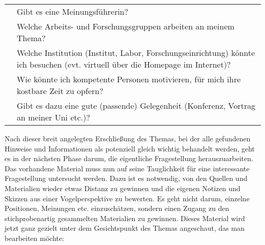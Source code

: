 \documentclass[]{article}
\begin{document}
\begin{longtable}[]{@{}rl@{}}
\begin{minipage}[t]{0.27\columnwidth}\raggedleft\strut
\strut
\end{minipage} & \begin{minipage}[t]{0.67\columnwidth}\raggedright\strut
Gibt es eine Meinungsführerin?\strut
\end{minipage}\tabularnewline
\begin{minipage}[t]{0.27\columnwidth}\raggedleft\strut
\strut
\end{minipage} & \begin{minipage}[t]{0.67\columnwidth}\raggedright\strut
Welche Arbeits- und Forschungsgruppen arbeiten an meinem Thema?\strut
\end{minipage}\tabularnewline
\begin{minipage}[t]{0.27\columnwidth}\raggedleft\strut
\strut
\end{minipage} & \begin{minipage}[t]{0.67\columnwidth}\raggedright\strut
Welche Institution (Institut, Labor, Forschungseinrichtung) könnte ich
besuchen (evt. virtuell über die Homepage im Internet)?\strut
\end{minipage}\tabularnewline
\begin{minipage}[t]{0.27\columnwidth}\raggedleft\strut
\strut
\end{minipage} & \begin{minipage}[t]{0.67\columnwidth}\raggedright\strut
Wie könnte ich kompetente Personen motivieren, für mich ihre kostbare
Zeit zu opfern?\strut
\end{minipage}\tabularnewline
\begin{minipage}[t]{0.27\columnwidth}\raggedleft\strut
\strut
\end{minipage} & \begin{minipage}[t]{0.67\columnwidth}\raggedright\strut
Gibt es dazu eine gute (passende) Gelegenheit (Konferenz, Vortrag an
meiner Uni etc.)?\strut
\end{minipage}\tabularnewline
\bottomrule
\end{longtable}

Nach dieser breit angelegten Erschließung des Themas, bei der alle
gefundenen Hinweise und Informationen als potenziell gleich wichtig
behandelt werden, geht es in der nächsten Phase darum, die eigentliche
Fragestellung herauszuarbeiten. Das vorhandene Material muss nun auf
seine Tauglichkeit für eine interessante Fragestellung untersucht
werden. Dazu ist es notwendig, von den Quellen und Materialien wieder
etwas Distanz zu gewinnen und die eigenen Notizen und Skizzen aus einer
Vogelperspektive zu bewerten. Es geht nicht darum, einzelne Positionen,
Meinungen etc. einzuschätzen, sondern einen Zugang zu den
stichprobenartig gesammelten Materialien zu gewinnen. Dieses Material
wird jetzt ganz gezielt unter dem Gesichtspunkt des Themas angeschaut,
das man bearbeiten möchte:
\end{document}
